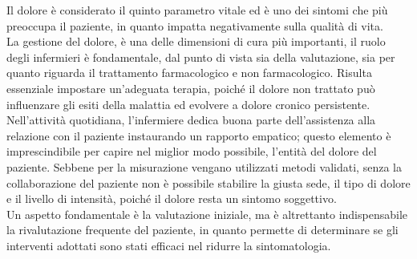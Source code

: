 Il dolore è considerato il quinto parametro vitale ed è uno dei sintomi che più preoccupa il paziente, 
in quanto impatta negativamente sulla qualità di vita.\\ La gestione del dolore, 
è una delle dimensioni di cura più importanti, il ruolo degli infermieri è fondamentale, 
dal punto di vista sia della valutazione, sia per quanto riguarda il trattamento farmacologico e non farmacologico. 
Risulta essenziale impostare un’adeguata terapia, poiché il dolore non trattato può 
influenzare gli esiti della malattia ed evolvere a dolore cronico persistente\cite{BOOK3}.\\
Nell'attività quotidiana, l'infermiere dedica buona parte dell'assistenza alla relazione con il paziente instaurando
un rapporto empatico; questo elemento è imprescindibile per capire nel miglior modo possibile, l'entità del
dolore del paziente. Sebbe­ne per la misurazione vengano utilizzati metodi validati, senza la collabo­razione del 
paziente non è possibile stabilire la giusta sede, il tipo di dolo­re e il livello di intensità, 
poiché il dolore resta un sintomo soggettivo\cite{BOOK3}.\\
Un aspetto fondamentale è la valutazione iniziale, ma è altret­tanto indispensabile la rivalutazione frequente del paziente, 
in quanto permette di determinare se gli interventi adottati sono stati effi­caci nel ridurre la 
sintomatologia\cite{BOOK3}.\\

